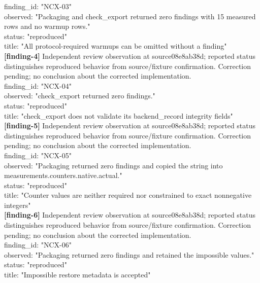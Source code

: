 \documentclass[11pt]{article}
\begin{document}
finding\_id: "NCX-03"\\
observed: "Packaging and check\_export returned zero findings with 15 measured rows and no warmup rows."\\
status: "reproduced"\\
title: "All protocol-required warmups can be omitted without a finding"\\
\textbf{[finding-4]} Independent review observation at source08e8ab38d; reported status distinguishes reproduced behavior from source/fixture confirmation. Correction pending; no conclusion about the corrected implementation.\\
finding\_id: "NCX-04"\\
observed: "check\_export returned zero findings."\\
status: "reproduced"\\
title: "check\_export does not validate its backend\_record integrity fields"\\
\textbf{[finding-5]} Independent review observation at source08e8ab38d; reported status distinguishes reproduced behavior from source/fixture confirmation. Correction pending; no conclusion about the corrected implementation.\\
finding\_id: "NCX-05"\\
observed: "Packaging returned zero findings and copied the string into measurements.counters.native.actual."\\
status: "reproduced"\\
title: "Counter values are neither required nor constrained to exact nonnegative integers"\\
\textbf{[finding-6]} Independent review observation at source08e8ab38d; reported status distinguishes reproduced behavior from source/fixture confirmation. Correction pending; no conclusion about the corrected implementation.\\
finding\_id: "NCX-06"\\
observed: "Packaging returned zero findings and retained the impossible values."\\
status: "reproduced"\\
title: "Impossible restore metadata is accepted"\\
\end{document}

